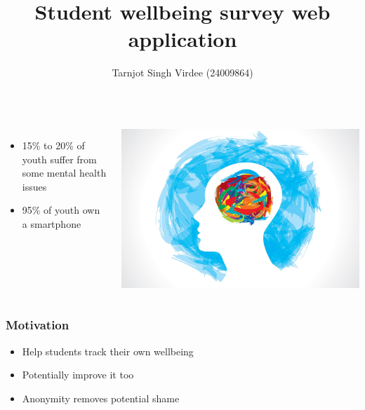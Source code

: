 \documentclass{beamer}
\title{Student wellbeing survey web application}
\author{Tarnjot Singh Virdee (24009864)}
\begin{document}
\maketitle

\begin{frame}
\begin{columns}
    \begin{itemize}
        \item 15\% to 20\% of youth suffer from some mental health issues
        \vspace{.2cm}
        \item 95\% of youth own a smartphone
    \end{itemize}

    \includegraphics[height=1\textheight]{images/Mental-Health-1.jpg}

\end{columns}
\end{frame}

\begin{frame}
    \frametitle{Motivation}
    \begin{itemize}
        \pause
        \item Help students track their own wellbeing 
        \pause
        \vspace{.2cm}
        \item Potentially improve it too 
        \pause 
        \vspace{.2cm}
        \item Anonymity removes potential shame
    \end{itemize}  
\end{frame}  
\end{document}
